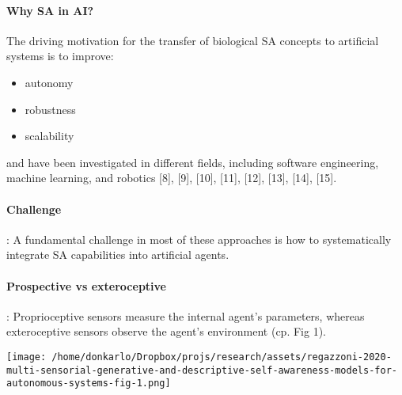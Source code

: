 \documentclass{article}
\begin{document}
			\paragraph{Why SA in AI?} The driving motivation for the transfer of biological SA concepts
			to artificial systems is to improve:
			\begin{itemize}
				\item autonomy
				\item robustness
				\item scalability
			\end{itemize}
			and have been investigated in different fields, including software engineering, machine learning, and robotics \citet{regazzoni-2020-multi-sensorial-generative-and-descriptive-self-awareness-models-for-autonomous-systems}[8],
			\citet{regazzoni-2020-multi-sensorial-generative-and-descriptive-self-awareness-models-for-autonomous-systems}[9], \citet{regazzoni-2020-multi-sensorial-generative-and-descriptive-self-awareness-models-for-autonomous-systems}[10], \citet{regazzoni-2020-multi-sensorial-generative-and-descriptive-self-awareness-models-for-autonomous-systems}[11], \citet{regazzoni-2020-multi-sensorial-generative-and-descriptive-self-awareness-models-for-autonomous-systems}[12], \citet{regazzoni-2020-multi-sensorial-generative-and-descriptive-self-awareness-models-for-autonomous-systems}[13], \citet{regazzoni-2020-multi-sensorial-generative-and-descriptive-self-awareness-models-for-autonomous-systems}[14], \citet{regazzoni-2020-multi-sensorial-generative-and-descriptive-self-awareness-models-for-autonomous-systems}[15]. 
			\paragraph{Challenge}: A fundamental challenge in most of these approaches is how to systematically integrate SA capabilities into artificial agents.
		
		\paragraph{Prospective vs exteroceptive}: Proprioceptive sensors measure the internal agent's parameters, whereas exteroceptive sensors observe the agent's environment (cp. \cite{regazzoni-2020-multi-sensorial-generative-and-descriptive-self-awareness-models-for-autonomous-systems} Fig 1).
		
		\begin{figure*}
			\centering
			\texttt{[image: /home/donkarlo/Dropbox/projs/research/assets/regazzoni-2020-multi-sensorial-generative-and-descriptive-self-awareness-models-for-autonomous-systems-fig-1.png]}
			\caption{\citet{regazzoni-2020-multi-sensorial-generative-and-descriptive-self-awareness-models-for-autonomous-systems}}
			\label{fig:regazzoni-2020-multi-sensorial-generative-and-descriptive-self-awareness-models-for-autonomous-systems-fig-1.jpg}
		\end{figure*}
		
\end{document}
